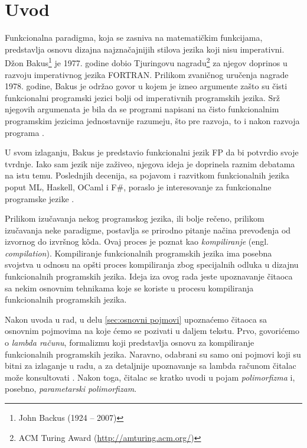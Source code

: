 \section{Uvod}
\label{sec:uvod}

Funkcionalna paradigma, koja se zasniva na matematičkim funkcijama, predstavlja osnovu dizajna najznačajnijih stilova jezika koji nisu imperativni. Džon Bakus\footnote{John Backus (1924 -- 2007)} je 1977. godine dobio Tjuringovu nagradu\footnote{ACM Turing Award (\url{http://amturing.acm.org/})} za njegov doprinos u razvoju imperativnog jezika FORTRAN. Prilikom zvaničnog uručenja nagrade 1978. godine, Bakus je održao govor u kojem je izneo argumente zašto su čisti funkcionalni programski jezici bolji od imperativnih programskih jezika. Srž njegovih argumenata je bila da se programi napisani na čisto funkcionalnim programskim jezicima jednostavnije razumeju, što pre razvoja, to i nakon razvoja programa \cite{Can-Programming-Be-Liberated-from-the-von-Neumann-Style?, Concepts-of-Programming-Languages}.

U svom izlaganju, Bakus je predstavio funkcionalni jezik FP da bi potvrdio svoje tvrdnje. Iako sam jezik nije zaživeo, njegova ideja je doprinela raznim debatama na istu temu. Poslednjih decenija, sa pojavom i razvitkom funkcionalnih jezika poput ML, Haskell, OCaml i F\#, poraslo je interesovanje za funkcionalne programske jezike \cite{Concepts-of-Programming-Languages}.

Prilikom izučavanja nekog programskog jezika, ili bolje rečeno, prilikom izučavanja neke paradigme, postavlja se prirodno pitanje načina prevođenja od izvornog do izvršnog k\^oda. Ovaj proces je poznat kao \textit{kompiliranje} (engl. \textit{compilation}). Kompiliranje funkcionalnih programskih jezika ima posebna svojstva u odnosu na opšti proces kompiliranja zbog specijalnih odluka u dizajnu funkcionalnih programskih jezika. Ideja iza ovog rada jeste upoznavanje čitaoca sa nekim osnovnim tehnikama koje se koriste u procesu kompiliranja funkcionalnih programskih jezika.

Nakon uvoda u rad, u delu \ref{sec:osnovni pojmovi} upoznaćemo čitaoca sa osnovnim pojmovima na koje ćemo se pozivati u daljem tekstu. Prvo, govorićemo o \textit{lambda računu}, formalizmu koji predstavlja osnovu za kompiliranje funkcionalnih programskih jezika. Naravno, odabrani su samo oni pojmovi koji su bitni za izlaganje u radu, a za detaljnije upoznavanje sa lambda računom čitalac može konsultovati \cite{Introduction-to-Combinators-and-Lambda-Calculus}. Nakon toga, čitalac se kratko uvodi u pojam \textit{polimorfizma} i, posebno, \textit{parametarski polimorfizam}.

